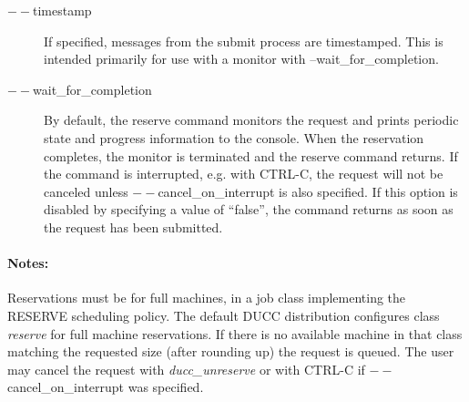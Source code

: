 \begin{description}
           \item[$--$timestamp ]
             If specified, messages from the submit process are timestamped. This is intended primarily 
             for use with a monitor with --wait\_for\_completion. 

           \item[$--$wait\_for\_completion ]             
             By default, the reserve command monitors the request and prints periodic
             state and progress information to the console.  When the reservation completes, the monitor
             is terminated and the reserve command returns.  If the command is interrupted, e.g. with CTRL-C,
             the request will not be canceled unless $--$cancel\_on\_interrupt is also specified.
             If this option is disabled by specifying a value of ``false'', the command returns as
             soon as the request has been submitted.


        \end{description}
            
    \paragraph{Notes:}
    Reservations must be for full machines, in a job class implementing the RESERVE scheduling
    policy. The default DUCC distribution configures class {\em reserve} for full machine
    reservations.  If there is no available machine in that class matching the requested size (after
    rounding up) the request is queued.  The user may cancel the request with {\em ducc\_unreserve}
    or with CTRL-C if $--$cancel\_on\_interrupt was specified.
